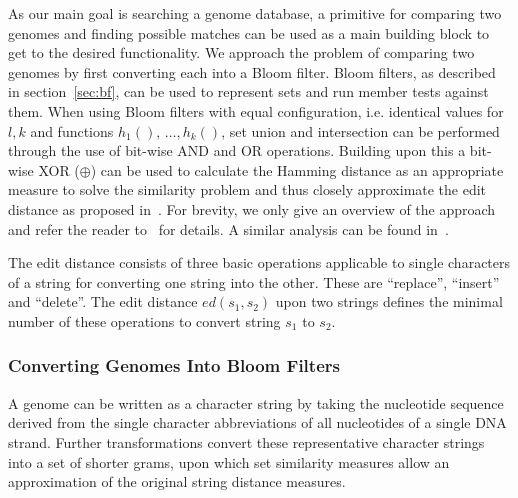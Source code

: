 \documentclass{llncs}
\begin{document}
As our main goal is searching a genome database, a primitive for comparing two genomes and finding possible matches can be used as a main building block to get to the desired functionality.
We approach the problem of comparing two genomes by first converting each into a Bloom filter.
Bloom filters, as described in section~\ref{sec:bf}, can be used to represent sets and run member tests against them.
When using Bloom filters with equal configuration, i.e. identical values for $l,k$ and functions $h_1(),\,\dots,h_k()$, set union and intersection can be performed through the use of bit-wise AND and OR operations.
Building upon this a bit-wise XOR ($\oplus$) can be used to calculate the Hamming distance as an appropriate measure to solve the similarity problem and thus closely approximate the edit distance as proposed in~\cite{BecKer12}.
For brevity, we only give an overview of the approach and refer the reader to~\cite{BecKer12} for details.
A similar analysis can be found in~\cite{DurXue12}.

The edit distance consists of three basic operations applicable to single characters of a string for converting one string into the other.
These are ``replace'', ``insert'' and ``delete''.
The edit distance $ed(s_1,s_2)$ upon two strings defines the minimal number of these operations to convert string $s_1$ to $s_2$.

\subsubsection{Converting Genomes Into Bloom Filters}
\label{sec:bloomCreation}

A genome can be written as a character string by taking the nucleotide sequence derived from the single character abbreviations of all nucleotides of a single DNA strand.
Further transformations convert these representative character strings into a set of shorter grams, upon which set similarity measures allow an approximation of the original string distance measures. 
\end{document}

